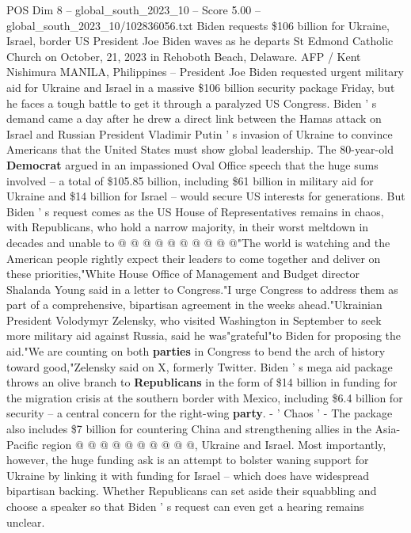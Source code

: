 \begin{textsample}{POS Dim 8 – global\_south\_2023\_10 – Score 5.00 – global\_south\_2023\_10/102836056.txt}  \label{ex:f8_pos_368}
Biden requests \$106 billion for Ukraine, Israel, border US President Joe Biden waves as he departs St Edmond Catholic Church on October, 21, 2023 in Rehoboth Beach, Delaware.
AFP / Kent Nishimura MANILA, Philippines -- President Joe Biden requested urgent military aid for Ukraine and Israel in a massive \$106 billion security package Friday, but he faces a tough battle to get it through a paralyzed US Congress.
Biden ' s demand came a day after he drew a direct link between the Hamas attack on Israel and Russian President Vladimir Putin ' s invasion of Ukraine to convince Americans that the United States must show global leadership.
The 80-year-old \textbf{Democrat} argued in an impassioned Oval Office speech that the huge sums involved -- a total of \$105.85 billion, including \$61 billion in military aid for Ukraine and \$14 billion for Israel -- would secure US interests for generations.
But Biden ' s request comes as the US House of Representatives remains in chaos, with Republicans, who hold a narrow majority, in their worst meltdown in decades and unable to @ @ @ @ @ @ @ @ @ @"The world is watching and the American people rightly expect their leaders to come together and deliver on these priorities,"White House Office of Management and Budget director Shalanda Young said in a letter to Congress."I urge Congress to address them as part of a comprehensive, bipartisan agreement in the weeks ahead."Ukrainian President Volodymyr Zelensky, who visited Washington in September to seek more military aid against Russia, said he was"grateful"to Biden for proposing the aid."We are counting on both \textbf{parties} in Congress to bend the arch of history toward good,"Zelensky said on X, formerly Twitter.
Biden ' s mega aid package throws an olive branch to \textbf{Republicans} in the form of \$14 billion in funding for the migration crisis at the southern border with Mexico, including \$6.4 billion for security -- a central concern for the right-wing \textbf{party}. - ' Chaos ' - The package also includes \$7 billion for countering China and strengthening allies in the Asia-Pacific region @ @ @ @ @ @ @ @ @ @, Ukraine and Israel.
Most importantly, however, the huge funding ask is an attempt to bolster waning support for Ukraine by linking it with funding for Israel -- which does have widespread bipartisan backing.
Whether Republicans can set aside their squabbling and choose a speaker so that Biden ' s request can even get a hearing remains unclear.

\end{textsample}
